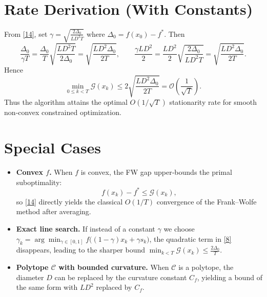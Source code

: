 \documentclass{article}
\newcommand{\Cset}{\mathcal{C}}
\newcommand{\gap}{\mathcal{G}}
\begin{document}
\section*{Rate Derivation (With Constants)}
From \eqref{14}, set $\gamma=\sqrt{\tfrac{2\Delta_{0}}{L D^{2}T}}$ where $\Delta_{0}=f(x_{0})-f^{*}$.
Then
\[
\frac{\Delta_{0}}{\gamma T}
   =\frac{\Delta_{0}}{T}\sqrt{\frac{L D^{2}T}{2\Delta_{0}}}
   =\sqrt{\frac{L D^{2}\Delta_{0}}{2T}},
\qquad
\frac{\gamma L D^{2}}{2}
   =\frac{L D^{2}}{2}\sqrt{\frac{2\Delta_{0}}{L D^{2}T}}
   =\sqrt{\frac{L D^{2}\Delta_{0}}{2T}}.
\]
Hence
\[
\min_{0\le k<T}\gap(x_{k})
\le 2\sqrt{\frac{L D^{2}\Delta_{0}}{2T}}
= \mathcal{O}\!\left(\frac{1}{\sqrt{T}}\right).
\]
Thus the algorithm attains the optimal $O(1/\sqrt{T})$ stationarity rate for
smooth non‑convex constrained optimization.

\section*{Special Cases}
\begin{itemize}
\item \textbf{Convex $f$.}  When $f$ is convex, the FW gap upper‑bounds the primal
suboptimality:
\[
f(x_{k})-f^{*}\le\gap(x_{k}),
\]
so \eqref{14} directly yields the classical $O(1/T)$ convergence of the
Frank–Wolfe method after averaging.
\item \textbf{Exact line search.}  If instead of a constant $\gamma$ we choose
$\gamma_{k}=\arg\min_{\gamma\in[0,1]} f\bigl((1-\gamma)x_{k}+\gamma s_{k}\bigr)$,
the quadratic term in \eqref{8} disappears, leading to the sharper bound
$\min_{k<T}\gap(x_{k})\le \frac{2\Delta_{0}}{T}$.
\item \textbf{Polytope $\Cset$ with bounded curvature.}  When $\Cset$ is a polytope,
the diameter $D$ can be replaced by the curvature constant $C_{f}$,
yielding a bound of the same form with $L D^{2}$ replaced by $C_{f}$.
\end{itemize}
\end{document}
